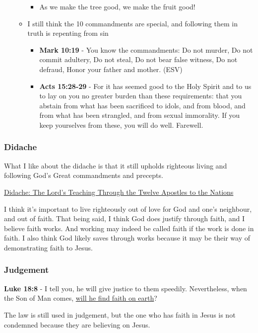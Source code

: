 \documentclass[11pt]{article}
\begin{document}
\begin{itemize}
\begin{itemize}
\begin{itemize}
\item As we make the tree good, we make the fruit good!
\end{itemize}
\item I still think the 10 commandments are special, and following them in truth is repenting from sin
\begin{itemize}
\item \textbf{Mark 10:19} - You know the commandments: Do not murder, Do not commit adultery, Do not steal, Do not bear false witness, Do not defraud, Honor your father and mother. (ESV)
\item \textbf{Acts 15:28-29} - For it has seemed good to the Holy Spirit and to us to lay on you no greater burden than these requirements: that you abstain from what has been sacrificed to idols, and from blood, and from what has been strangled, and from sexual immorality. If you keep yourselves from these, you will do well. Farewell.
\end{itemize}
\end{itemize}
\end{itemize}

\subsubsection{Didache}
\label{sec:orgeeb7b6c}
What I like about the didache is that it still upholds righteous living and following God's Great commandments and precepts.

\href{https://www.earlychristianwritings.com/text/didache-roberts.html}{Didache: The Lord's Teaching Through the Twelve Apostles to the Nations}

I think it's important to live righteously out of love for God and one's neighbour, and out of faith.
That being said, I think God does justify through faith, and I believe faith works. And working may indeed be called faith if the work is done in faith.
I also think God likely saves through works because it may be their way of demonstrating faith to Jesus.

\subsubsection{Judgement}
\label{sec:org2b60ecc}
\textbf{Luke 18:8} - I tell you, he will give justice to them speedily. Nevertheless, when the Son of Man comes, \uline{will he find faith on earth}?

The law is still used in judgement, but the one who has faith in Jesus is not condemned because they are believing on Jesus.
\end{document}
